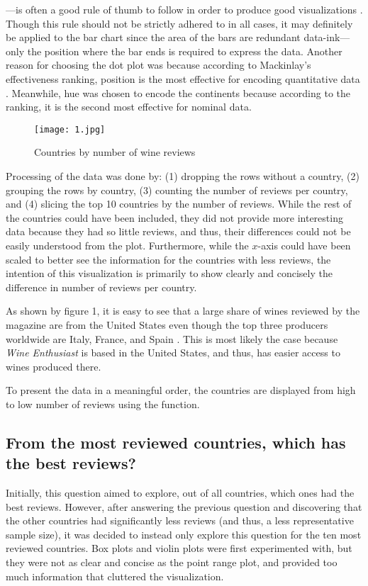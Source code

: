 \noindent ---is often a good rule of thumb to follow in order to produce good visualizations \cite{Tufte}. Though this rule should not be strictly adhered to in all cases, it may definitely be applied to the bar chart since the area of the bars are redundant data-ink---only the position where the bar ends is required to express the data. Another reason for choosing the dot plot was because according to Mackinlay's effectiveness ranking, position is the most effective for encoding quantitative data \cite{Mackinlay}. Meanwhile, hue was chosen to encode the continents because according to the ranking, it is the second most effective for nominal data.

\begin{figure}[h]
  \texttt{[image: 1.jpg]}  
  \caption{Countries by number of wine reviews}
\end{figure}

Processing of the data was done by: (1) dropping the rows without a country, (2) grouping the rows by country, (3) counting the number of reviews per country, and (4) slicing the top 10 countries by the number of reviews. While the rest of the countries could have been included, they did not provide more interesting data because they had so little reviews, and thus, their differences could not be easily understood from the plot. Furthermore, while the $x$-axis could have been scaled to better see the information for the countries with less reviews, the intention of this visualization is primarily to show clearly and concisely the difference in number of reviews per country.

As shown by figure 1, it is easy to see that a large share of wines reviewed by the magazine are from the United States even though the top three producers worldwide are Italy, France, and Spain \cite{Statista}. This is most likely the case because \emph{Wine Enthusiast} is based in the United States, and thus, has easier access to wines produced there.



To present the data in a meaningful order, the countries are displayed from high to low number of reviews using the  function.

\subsection{From the most reviewed countries, which has the best reviews?}
Initially, this question aimed to explore, out of all countries, which ones had the best reviews. However, after answering the previous question and discovering that the other countries had significantly less reviews (and thus, a less representative sample size), it was decided to instead only explore this question for the ten most reviewed countries. Box plots and violin plots were first experimented with, but they were not as clear and concise as the point range plot, and provided too much information that cluttered the visualization.

